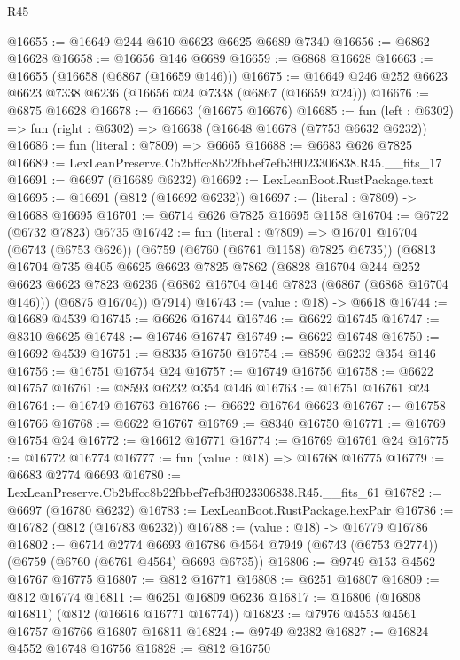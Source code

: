 \begin{lexlean}{R45}
\begin{coremodule}
{@16655 := @16649 @244 @610 @6623 @6625 @6689 @7340
@16656 := @6862 @16628
@16658 := @16656 @146 @6689
@16659 := @6868 @16628
@16663 := @16655 (@16658 (@6867 (@16659 @146)))
@16675 := @16649 @246 @252 @6623 @6623 @7338 @6236 (@16656 @24 @7338 (@6867 (@16659 @24)))
@16676 := @6875 @16628
@16678 := @16663 (@16675 @16676)
@16685 := fun (left : @6302) => fun (right : @6302) => @16638 (@16648 @16678 (@7753 @6632 @6232))
@16686 := fun (literal : @7809) => @6665
@16688 := @6683 @626 @7825
@16689 := LexLeanPreserve.Cb2bffcc8b22fbbef7efb3ff023306838.R45.__fits_17
@16691 := @6697 (@16689 @6232)
@16692 := LexLeanBoot.RustPackage.text
@16695 := @16691 (@812 (@16692 @6232))
@16697 := (literal : @7809) -> @16688 @16695
@16701 := @6714 @626 @7825 @16695 @1158
@16704 := @6722 (@6732 @7823) @6735
@16742 := fun (literal : @7809) =>
  @16701
    @16704
    (@6743 (@6753 @626))
    (@6759 (@6760 (@6761 @1158) @7825 @6735))
    (@6813
      @16704
      @735
      @405
      @6625
      @6623
      @7825
      @7862
      (@6828
        @16704
        @244
        @252
        @6623
        @6623
        @7823
        @6236
        (@6862 @16704 @146 @7823 (@6867 (@6868 @16704 @146)))
        (@6875 @16704))
      @7914)
@16743 := (value : @18) -> @6618
@16744 := @16689 @4539
@16745 := @6626 @16744
@16746 := @6622 @16745
@16747 := @8310 @6625
@16748 := @16746 @16747
@16749 := @6622 @16748
@16750 := @16692 @4539
@16751 := @8335 @16750
@16754 := @8596 @6232 @354 @146
@16756 := @16751 @16754 @24
@16757 := @16749 @16756
@16758 := @6622 @16757
@16761 := @8593 @6232 @354 @146
@16763 := @16751 @16761 @24
@16764 := @16749 @16763
@16766 := @6622 @16764 @6623
@16767 := @16758 @16766
@16768 := @6622 @16767
@16769 := @8340 @16750
@16771 := @16769 @16754 @24
@16772 := @16612 @16771
@16774 := @16769 @16761 @24
@16775 := @16772 @16774
@16777 := fun (value : @18) => @16768 @16775
@16779 := @6683 @2774 @6693
@16780 := LexLeanPreserve.Cb2bffcc8b22fbbef7efb3ff023306838.R45.__fits_61
@16782 := @6697 (@16780 @6232)
@16783 := LexLeanBoot.RustPackage.hexPair
@16786 := @16782 (@812 (@16783 @6232))
@16788 := (value : @18) -> @16779 @16786
@16802 := @6714
    @2774
    @6693
    @16786
    @4564
    @7949
    (@6743 (@6753 @2774))
    (@6759 (@6760 (@6761 @4564) @6693 @6735))
@16806 := @9749 @153 @4562 @16767 @16775
@16807 := @812 @16771
@16808 := @6251 @16807
@16809 := @812 @16774
@16811 := @6251 @16809 @6236
@16817 := @16806 (@16808 @16811) (@812 (@16616 @16771 @16774))
@16823 := @7976 @4553 @4561 @16757 @16766 @16807 @16811
@16824 := @9749 @2382
@16827 := @16824 @4552 @16748 @16756
@16828 := @812 @16750
}
\end{coremodule}
\end{lexlean}
